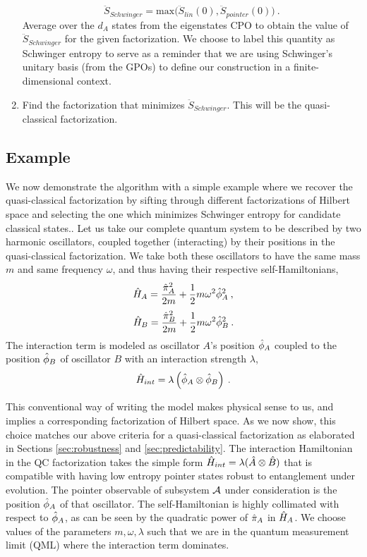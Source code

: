 \documentclass[aps,pra,onecolumn,nofootinbib,notitlepage,11pt,tightenlines]{revtex4-1}
\begin{document}
\begin{enumerate}
{\begin{equation}
\label{S_schwinger}
\ddot{S}_{Schwinger} = \mathrm{max} \biggl(\ddot{S}_{lin}(0), \ddot{S}_{pointer}(0) \biggr) \: .
\end{equation}
Average over the $d_A$ states from the eigenstates CPO to obtain the value of $\ddot{S}_{Schwinger}$ for the given factorization. We choose to label this quantity as Schwinger entropy to serve as a reminder that we are  using Schwinger's unitary basis (from the GPOs) to define our construction in a finite-dimensional context.}
\item{Find the factorization that minimizes $\ddot{S}_{Schwinger}$. This will be the quasi-classical factorization.}
\end{enumerate}

\subsection{Example}
\label{subsec:algo_action}
We now demonstrate the algorithm with a simple example where we recover the quasi-classical factorization by sifting through different factorizations of Hilbert space and selecting the one which minimizes Schwinger entropy for candidate classical states..
Let us take our complete quantum system to be described by two harmonic oscillators, coupled together (interacting) by their positions in the quasi-classical factorization. We take both these oscillators to have the same mass $m$ and same frequency $\omega$, and thus having their respective self-Hamiltonians,
\begin{equation}
\ham_{A} = \frac{\oppi^{2}_A}{2m} + \frac{1}{2}m\omega^{2}\opphi^{2}_{A} \: ,
\end{equation}
\begin{equation}
\ham_{B} = \frac{\oppi^{2}_B}{2m} + \frac{1}{2}m\omega^{2}\opphi^{2}_{B} \: .
\end{equation}
The interaction term is modeled as oscillator $A$'s position $\hat{\phi}_{A}$ coupled to the position $\hat{\phi}_B$ of oscillator $B$ with an interaction strength $\lambda$,
\begin{equation}
\ham_{int}  = \lambda \left(\opphi_{A} \otimes \opphi_{B}\right) \: .
\end{equation}

This conventional way of writing the model makes physical sense to us, and implies a corresponding factorization of Hilbert space.
As we now show, this choice matches our above criteria for a quasi-classical factorization as elaborated in Sections \ref{sec:robustness} and \ref{sec:predictability}. 
The interaction Hamiltonian in the QC factorization takes the simple form $\hat{H}_{int} = \lambda(\hat{A} \otimes \hat{B} )$ that is compatible with having low entropy pointer states robust to entanglement under evolution. The pointer observable of subsystem $\mathcal{A}$ under consideration is the position $\hat{\phi}_A$ of that oscillator. The self-Hamiltonian is highly collimated with respect to $\hat{\phi}_A$, as can be seen by the quadratic power of $\hat{\pi}_A$ in $\hat{H}_{A}$. We choose values of the parameters $m,\omega,\lambda$ such that we are in the quantum measurement limit (QML) where the interaction term dominates.
\end{document}
